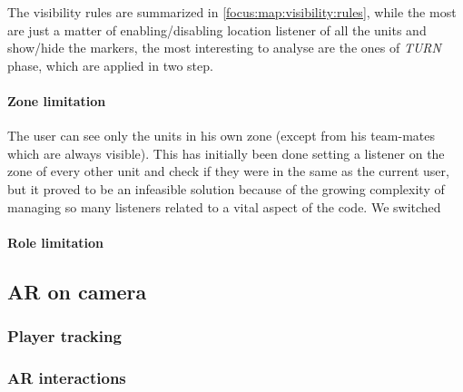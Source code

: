 				
				The visibility rules are summarized in \autoref{focus:map:visibility:rules}, while the most are just a matter of enabling/disabling location listener of all the units and show/hide the markers, the most interesting to analyse are the ones of \emph{TURN} phase, which are applied in two step. 
				
				\paragraph{Zone limitation}
				
					The user can see only the units in his own zone (except from his team-mates which are always visible). This has initially been done setting a listener on the zone of every other unit and check if they were in the same as the current user, but it proved to be an infeasible solution because of the growing complexity of managing so many listeners related to a vital aspect of the code.
					We switched %
				
				\paragraph{Role limitation}
				
					
				
		\subsection{AR on camera}\label{focus:augmented}
			
			\subsubsection{Player tracking}
			
			\subsubsection{AR interactions}